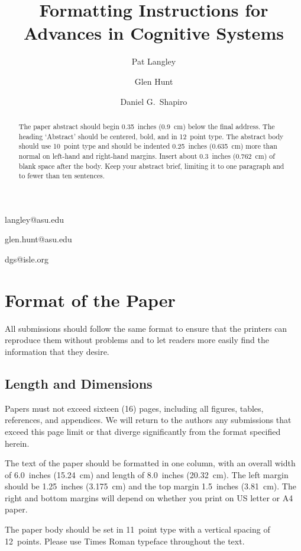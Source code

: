 \documentclass[11pt,letterpaper]{article}
\begin{document}
 

\title{Formatting Instructions for Advances in Cognitive Systems}
 
\author{Pat Langley}{langley@asu.edu}
\author{Glen Hunt}{glen.hunt@asu.edu}
\address{Computing Science and Engineering, Arizona State University, 
         Tempe, AZ 85287 USA}
\author{Daniel G.\ Shapiro}{dgs@isle.org}
\address{Institute for the Study of Learning and Expertise, 
         2164 Staunton Court, Palo Alto, CA 94306 USA}
\vskip 0.2in
 
\begin{abstract} 
The paper abstract should begin 0.35~inches (0.9~cm) below the final 
address.  The heading `Abstract' should be centered, bold, and in
12~point type. The abstract body should use 10~point type and should
be indented 0.25~inches (0.635~cm) more than normal on left-hand and
right-hand margins. Insert about 0.3~inches (0.762~cm) of blank space
after the body. Keep your abstract brief, limiting it to one paragraph
and to fewer than ten sentences.
\end{abstract} 


\section{Format of the Paper} 
 
All submissions should follow the same format to ensure that the 
printers can reproduce them without problems and to let readers 
more easily find the information that they desire.

\subsection{Length and Dimensions}

Papers must not exceed sixteen (16) pages, including all figures,
tables, references, and appendices. We will return to the authors any
submissions that exceed this page limit or that diverge significantly
from the format specified herein.

The text of the paper should be formatted in one column, with an
overall width of 6.0~inches (15.24~cm) and length of 8.0~inches 
(20.32~cm). The left margin should be 1.25~inches (3.175~cm) and the 
top margin 1.5~inches (3.81~cm). The right and bottom margins will
depend on whether you print on US letter or A4 paper.

The paper body should be set in 11~point type with a vertical spacing 
of 12~points. Please use Times Roman typeface throughout the text. 
\end{document}
